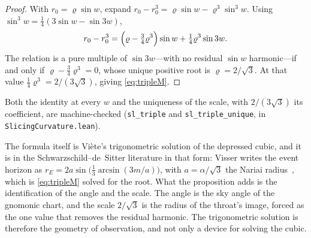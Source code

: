 \documentclass[11pt,a4paper]{article}
\theoremstyle{definition}
\begin{document}
\begin{proof}
With $r_{0}=\varrho\sin w$, expand $r_{0}-r_{0}^{3}=\varrho\sin w-\varrho^{3}\sin^{3}w$. Using $\sin^{3}w=\tfrac14(3\sin w-\sin 3w)$,
\[
  r_{0}-r_{0}^{3}=\Bigl(\varrho-\tfrac34 \varrho^{3}\Bigr)\sin w+\tfrac14 \varrho^{3}\sin 3w .
\]
The relation is a pure multiple of $\sin 3w$---with no residual $\sin w$ harmonic---if and only if $\varrho-\tfrac34 \varrho^{3}=0$, whose unique positive root is $\varrho=2/\sqrt3$. At that value $\tfrac14 \varrho^{3}=2/(3\sqrt3)$, giving \eqref{eq:tripleM}.
\end{proof}

Both the identity at every $w$ and the uniqueness of the scale, with $2/(3\sqrt3)$ its coefficient, are machine-checked (\texttt{sl\_triple} and \texttt{sl\_triple\_unique}, in \texttt{SlicingCurvature.lean}).

The formula itself is Vi\`ete's trigonometric solution of the depressed cubic, and it is in the Schwarzschild--de~Sitter literature in that form: Visser writes the event horizon as $r_{E}=2a\sin\bigl(\tfrac13\arcsin(3m/a)\bigr)$, with $a=\alpha/\sqrt3$ the Nariai radius~\cite{Visser2013}, which is \eqref{eq:tripleM} solved for the root. What the proposition adds is the identification of the angle and the scale. The angle is the sky angle of the gnomonic chart, and the scale $2/\sqrt3$ is the radius of the throat's image, forced as the one value that removes the residual harmonic. The trigonometric solution is therefore the geometry of observation, and not only a device for solving the cubic.
\end{document}
